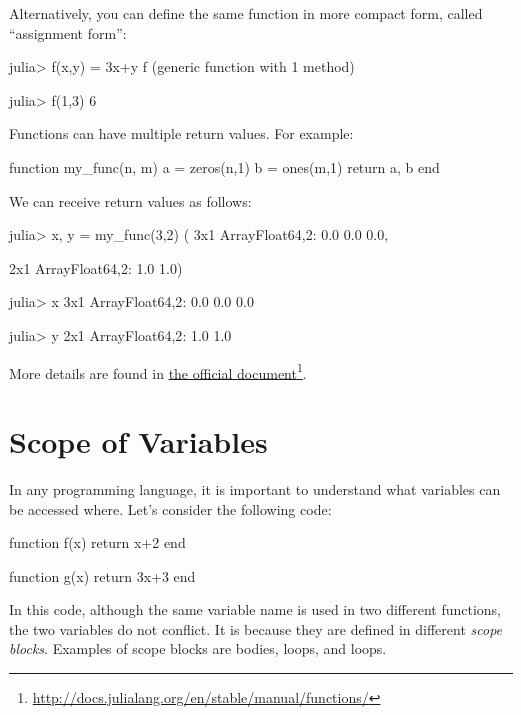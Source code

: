Alternatively, you can define the same function in more compact form, called ``assignment form'':
\begin{code}
julia> f(x,y) = 3x+y
f (generic function with 1 method)

julia> f(1,3)
6
\end{code}

Functions can have multiple return values. For example:
\begin{code}
function my_func(n, m)
	a = zeros(n,1)
	b = ones(m,1)
	return a, b
end
\end{code}
\noindent We can receive return values as follows:
\begin{code}
julia> x, y = my_func(3,2)
(
3x1 Array{Float64,2}:
 0.0
 0.0
 0.0,

2x1 Array{Float64,2}:
 1.0
 1.0)

julia> x
3x1 Array{Float64,2}:
 0.0
 0.0
 0.0

julia> y
2x1 Array{Float64,2}:
 1.0
 1.0
\end{code}

More details are found in \href{http://docs.julialang.org/en/stable/manual/functions/}{the official document}\footnote{\url{http://docs.julialang.org/en/stable/manual/functions/}}.






\section{Scope of Variables} \label{sec:scope}

In any programming language, it is important to understand what variables can be accessed where. Let's consider the following code:
\begin{code}
function f(x)
    return x+2
end

function g(x)
    return 3x+3
end
\end{code}
\noindent In this code, although the same variable name  is used in two different functions, the two  variables do not conflict. It is because they are defined in different \emph{scope blocks}. Examples of scope blocks are  bodies,  loops, and  loops.

